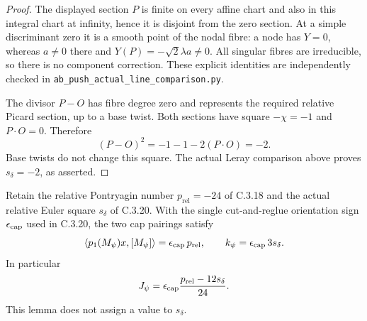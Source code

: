 \begin{proof}
The displayed section $P$ is finite on every affine chart and
also in this integral chart at infinity, hence it is disjoint
from the zero section. At a simple discriminant zero it is a
smooth point of the nodal fibre: a node has $Y=0$, whereas
$a\ne0$ there and $Y(P)=-\sqrt2\lambda a\ne0$.
All singular fibres are irreducible, so there is no component
correction. These explicit identities are independently checked
in \texttt{ab\_push\_actual\_line\_comparison.py}.

The divisor $P-O$ has fibre degree zero and represents the
required relative Picard section, up to a base twist. Both
sections have square $-\chi=-1$ and $P\cdot O=0$. Therefore
\[
 (P-O)^2=-1-1-2(P\cdot O)=-2.
\]
Base twists do not change this square. The actual Leray
comparison above proves $s_\delta=-2$, as asserted.
\end{proof}
\begin{lemma}
Retain the relative Pontryagin number
$p_{\mathrm{rel}}=-24$ of C.3.18 and the actual relative
Euler square $s_\delta$ of C.3.20. With the single
cut-and-reglue orientation sign $\epsilon_{\rm cap}$ used
in C.3.20, the two cap pairings satisfy
\[
 \langle p_1(M_\psi)x,[M_\psi]\rangle
       =\epsilon_{\rm cap}\,p_{\mathrm{rel}},
 \qquad
 k_\psi=\epsilon_{\rm cap}\,3s_\delta.
\]
In particular
\[
 J_\psi=\epsilon_{\rm cap}
              \frac{p_{\mathrm{rel}}-12s_\delta}{24}.
\]
This lemma does not assign a value to $s_\delta$.
\end{lemma}
